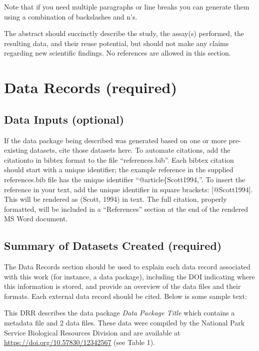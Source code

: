 \documentclass[
]{article}
\begin{document}
Note that if you need multiple paragraphs or line breaks you can
generate them using a combination of backslashes and n's.

The abstract should succinctly describe the study, the assay(s)
performed, the resulting data, and their reuse potential, but should not
make any claims regarding new scientific findings. No references are
allowed in this section.

\hypertarget{data-records-required}{%
\section{Data Records (required)}\label{data-records-required}}

\hypertarget{data-inputs-optional}{%
\subsection{Data Inputs (optional)}\label{data-inputs-optional}}

If the data package being described was generated based on one or more
pre-existing datasets, cite those datasets here. To automate citations,
add the citationto in bibtex format to the file ``references.bib''. Each
bibtex citation should start with a unique identifier; the example
reference in the supplied references.bib file has the unique identifier
``@article\{Scott1994,''. To insert the reference in your text, add the
unique identifier in square brackets: {[}@Scott1994{]}. This will be
rendered as (Scott, 1994) in text. The full citation, properly
formatted, will be included in a ``References'' section at the end of
the rendered MS Word document.

\hypertarget{summary-of-datasets-created-required}{%
\subsection{Summary of Datasets Created
(required)}\label{summary-of-datasets-created-required}}

The Data Records section should be used to explain each data record
associated with this work (for instance, a data package), including the
DOI indicating where this information is stored, and provide an overview
of the data files and their formats. Each external data record should be
cited. Below is some sample text:

This DRR describes the data package \emph{Data Package Title} which
contains a metadata file and 2 data files. These data were compiled by
the National Park Service Biological Resources Division and are
available at \url{https://doi.org/10.57830/12342567} (see Table 1).
\end{document}
